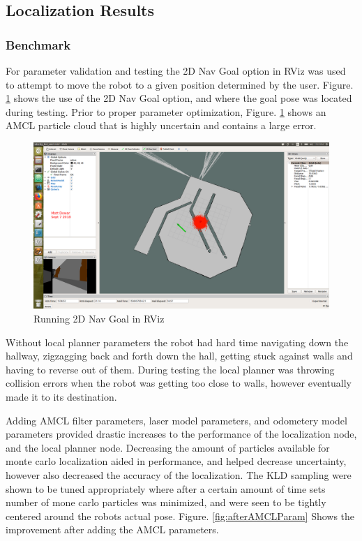 \documentclass[10pt,journal,compsoc]{IEEEtran}
\begin{document}
\subsection{Localization Results}
\subsubsection{Benchmark}

For parameter validation and testing the 2D Nav Goal option in RViz was used to attempt to move the robot to a given position determined by the user. Figure. \ref{fig:2DNavGoal} shows the use of the 2D Nav Goal option, and where the goal pose was located during testing. Prior to proper parameter optimization, Figure. \ref{fig:2DNavGoal} shows an AMCL particle cloud that is highly uncertain and contains a large error.

\begin{figure}[thpb]
    \centering
    \includegraphics[width=\linewidth]{../img/rviz_2DNavGoal.png}
    \caption{Running 2D Nav Goal in RViz}
    \label{fig:2DNavGoal}
\end{figure}

Without local planner parameters the robot had hard time navigating down the hallway, zigzagging back and forth down the hall, getting stuck against walls and having to reverse out of them. During testing the local planner was throwing collision errors when the robot was getting too close to walls, however eventually made it to its destination.

Adding AMCL filter parameters, laser model parameters, and odometery model parameters provided drastic increases to the performance of the localization node, and the local planner node. Decreasing the amount of particles available for monte carlo localization aided in performance, and helped decrease uncertainty, however also decreased the accuracy of the localization. The KLD sampling were shown to be tuned appropriately where after a certain amount of time sets number of mone carlo particles was minimized, and were seen to be tightly centered around the robots actual pose. Figure. \ref{fig:afterAMCLParam} Shows the improvement after adding the AMCL parameters.
\end{document}
